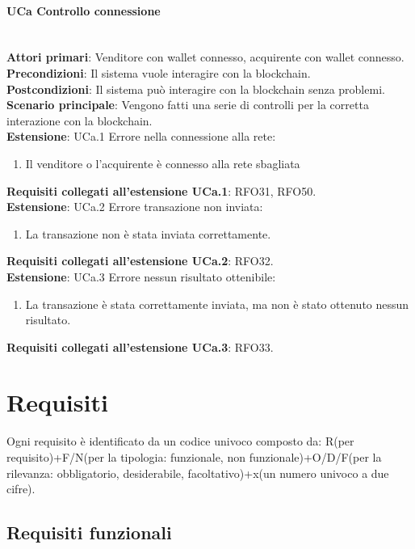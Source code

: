 \documentclass[a4paper, 12pt]{article}
\begin{document}
\paragraph{UCa Controllo connessione}\\
\textbf{Attori primari}: Venditore con wallet connesso, acquirente con wallet connesso. \\
\textbf{Precondizioni}: Il sistema vuole interagire con la blockchain.\\
\textbf{Postcondizioni}:  Il sistema può interagire con la blockchain senza problemi.\\
\textbf{Scenario principale}:
Vengono fatti una serie di controlli per la corretta interazione con la blockchain.\\
\textbf{Estensione}: UCa.1 Errore nella connessione alla rete:
\begin{enumerate}
\item Il venditore o l'acquirente è connesso alla rete sbagliata
\end{enumerate}
\textbf{Requisiti collegati all'estensione UCa.1}: RFO31, RFO50.\\
\textbf{Estensione}: UCa.2 Errore transazione non inviata:
\begin{enumerate}
\item La transazione non è stata inviata correttamente.
\end{enumerate}
\textbf{Requisiti collegati all'estensione UCa.2}: RFO32.\\
\textbf{Estensione}: UCa.3 Errore nessun risultato ottenibile:
\begin{enumerate}
\item La transazione è stata correttamente inviata, ma non è stato ottenuto nessun risultato.
\end{enumerate}
\textbf{Requisiti collegati all'estensione UCa.3}: RFO33.

\section{Requisiti}
Ogni requisito è identificato da un codice univoco composto da: R(per requisito)+F/N(per la tipologia: funzionale, non funzionale)+O/D/F(per la rilevanza: obbligatorio, desiderabile, facoltativo)+x(un numero univoco a due cifre).
\subsection{Requisiti funzionali}
\end{document}
